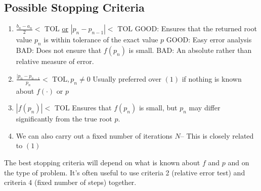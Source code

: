 \documentclass[12pt]{article}
\begin{document}
\subsection{Possible Stopping Criteria}

\begin{enumerate}
  \item $\displaystyle \frac{b_n-a_n}{2} < \text{ TOL}$ \quad\uline{or} \quad
    $\displaystyle \left| p_n - p_{n-1} \right| < \text{ TOL}$
    \subitem GOOD: Ensures that the returned root value $p_n$ is within 
    tolerance of the exact value $p$
    \subitem GOOD: Easy error analysis
    \subitem BAD: Does not ensure that $f(p_n)$ is small.
    \subitem BAD: An absolute rather than relative measure of error.
  \item $\displaystyle \frac{|p_n - p_{n-1}}{p_n} < \text{ TOL}, p_n \neq 0$
    \subitem Usually preferred over $(1)$ if nothing is known about $f(\cdot)$ or
    $p$
  \item $\left| f(p_n) \right| < \text{ TOL}$
    \subitem Ensures that $f(p_n)$ is small, but $p_n$ may differ significantly
    from the true root $p$.
  \item We can also carry out a fixed number of iterations $N$-- This is closely
    related to $(1)$
\end{enumerate}

The best stopping criteria will depend on what is known about $f$ and $p$ and
on the type of problem. It's often useful to use criteria 2 (relative error test)
and criteria 4 (fixed number of steps) together.
\end{document}

